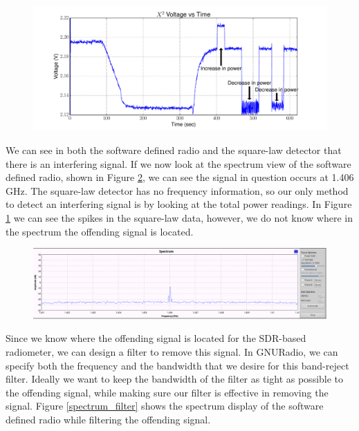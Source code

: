 \begin{figure}[h!tb] \centering
\includegraphics[width=\textwidth]{Experiments/Exp4/x2_voltage.pdf}
\label{x2_unfilt_signal}
\end{figure}

We can see in both the software defined radio and the square-law detector that there is an interfering signal.  If we now look at the spectrum view of the software defined radio, shown in Figure \ref{spectrum_interfering}, we can see the signal in question occurs  at 1.406 GHz.  The square-law detector has no frequency information, so our only method to detect an interfering signal is by looking at the total power readings.  In Figure \ref{x2_unfilt_signal} we can see the spikes in the square-law data, however, we do not know where in the spectrum the offending signal is located.

\begin{figure}[h!tb] \centering
\includegraphics[width=\textwidth]{Images/interfering_signal_filter.png}
\label{spectrum_interfering}
\end{figure}

Since we know where the offending signal is located for the SDR-based radiometer, we can design a filter to remove this signal.  In GNURadio, we can specify both the frequency and the bandwidth that we desire for this band-reject filter.  Ideally we want to keep the bandwidth of the filter as tight as possible to the offending signal, while making sure our filter is effective in removing the signal.  Figure \ref{spectrum_filter} shows the spectrum display of the software defined radio while filtering the offending signal.


